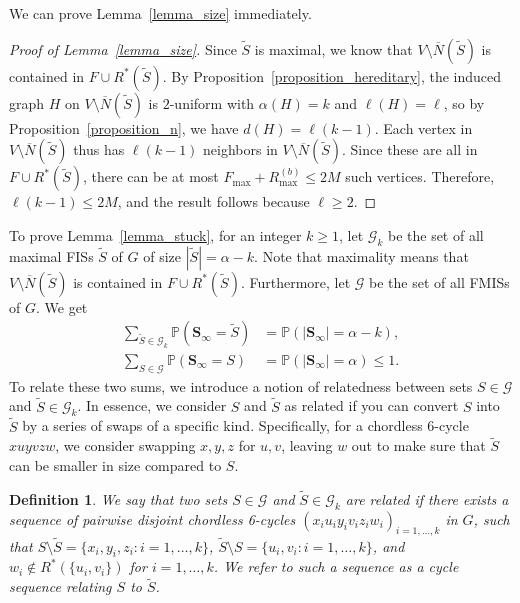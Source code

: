 \documentclass{article}
\theoremstyle{plain}
\theoremstyle{remark}
\theoremstyle{plain}
\newtheorem{definition}[theorem]{Definition}
\numberwithin{equation}{section}
\begin{document}
	We can prove Lemma~\ref{lemma_size} immediately.
	
	\begin{proof}[Proof of Lemma~\ref{lemma_size}]
		Since $\widetilde{S}$ is maximal, we know that $V\setminus\overline{N}(\widetilde{S})$ is contained in $F\cup R^*(\widetilde{S})$. By Proposition~\ref{proposition_hereditary}, the induced graph $H$ on $V\setminus\overline{N}(\widetilde{S})$ is $2$-uniform with $\alpha(H)=k$ and $\ell(H)=\ell$, so by Proposition~\ref{proposition_n}, we have $d(H)=\ell(k-1)$. Each vertex in $V\setminus\overline{N}(\widetilde{S})$ thus has $\ell(k-1)$ neighbors in $V\setminus\overline{N}(\widetilde{S})$. Since these are all in $F\cup R^*(\widetilde{S})$, there can be at most $F_{\max}+R_{\max}^{(b)}\leq2M$ such vertices. Therefore, $\ell(k-1)\leq2M$, and the result follows because $\ell\geq2$.
	\end{proof}
	
	To prove Lemma~\ref{lemma_stuck}, for an integer $k\geq1$, let $\mathcal{G}_k$ be the set of all maximal FISs $\widetilde{S}$ of $G$ of size $|\widetilde{S}|=\alpha-k$. Note that maximality means that $V\setminus\overline{N}(\widetilde{S})$ is contained in $F\cup R^*(\widetilde{S})$. Furthermore, let $\mathcal{G}$ be the set of all FMISs of $G$. We get
	\begin{align}
		\sum_{\widetilde{S}\in\mathcal{G}_k}\mathbb{P}(\boldsymbol{S}_{\infty}=\widetilde{S})
		&=\mathbb{P}(|\boldsymbol{S}_{\infty}|=\alpha-k),
		\\\sum_{S\in\mathcal{G}}\mathbb{P}(\boldsymbol{S}_{\infty}=S)
		&=\mathbb{P}(|\boldsymbol{S}_{\infty}|=\alpha)\leq1.
	\end{align}
	To relate these two sums, we introduce a notion of relatedness between sets $S\in\mathcal{G}$ and $\widetilde{S}\in\mathcal{G}_k$. In essence, we consider $S$ and $\widetilde{S}$ as related if you can convert $S$ into $\widetilde{S}$ by a series of swaps of a specific kind. Specifically, for a chordless 6-cycle $xuyvzw$, we consider swapping $x,y,z$ for $u,v$, leaving $w$ out to make sure that $\widetilde{S}$ can be smaller in size compared to $S$.
	
	\begin{definition}
		We say that two sets $S\in\mathcal{G}$ and $\widetilde{S}\in\mathcal{G}_k$ are \emph{related} if there exists a sequence of pairwise disjoint chordless 6-cycles $(x_iu_iy_iv_iz_iw_i)_{i=1,\ldots,k}$ in $G$, such that $S\setminus\widetilde{S}=\{x_i,y_i,z_i:i=1,\ldots,k\}$, $\widetilde{S}\setminus S=\{u_i,v_i:i=1,\ldots,k\}$, and $w_i\not\in R^*(\{u_i,v_i\})$ for $i=1,\ldots,k$. We refer to such a sequence as a \emph{cycle sequence} relating $S$ to $\widetilde{S}$.
	\end{definition}
	
\end{document}

